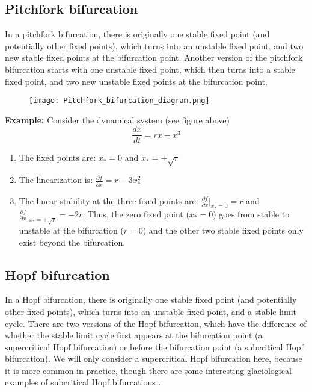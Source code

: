 \documentclass[12pt]{article}
\theoremstyle{definition}
\newcommand{\pd}[2]{\frac{\partial {#1}}{\partial {#2}}}
\begin{document}
\subsection{Pitchfork bifurcation}
In a pitchfork bifurcation, there is originally one stable fixed point (and potentially other fixed points), which turns into an unstable fixed point, and two new stable fixed points at the bifurcation point. Another version of the pitchfork bifurcation starts with one unstable fixed point, which then turns into a stable fixed point, and two new unstable fixed points at the bifurcation point.

\begin{figure}[h]
  \begin{center}
\texttt{[image: Pitchfork\_bifurcation\_diagram.png]}
  \end{center}
\end{figure}

\begin{shaded}
\textbf{Example:} Consider the dynamical system (see figure above)
\begin{equation}
\frac{dx}{dt} = rx - x^3
\end{equation}
\begin{enumerate}
\item The fixed points are: $x_* = 0$ and $x_* = \pm \sqrt{r}$
\item The linearization is: $\pd{f}{x} = r - 3x_*^2$
\item The linear stability at the three fixed points are: $\pd{f}{x}|_{x_* = 0} = r$ and $\pd{f}{x}|_{x_* = \pm \sqrt{r}} = -2r$. Thus, the zero fixed point ($x_* = 0$) goes from stable to unstable at the bifurcation ($r=0$) and the other two stable fixed points only exist beyond the bifurcation.
\end{enumerate}
\end{shaded}

\subsection{Hopf bifurcation}
In a Hopf bifurcation, there is originally one stable fixed point (and potentially other fixed points), which turns into an unstable fixed point, and a stable limit cycle. There are two versions of the Hopf bifurcation, which have the difference of whether the stable limit cycle first appears at the bifurcation point (a supercritical Hopf bifurcation) or before the bifurcation point (a subcritical Hopf bifurcation). We will only consider a supercritical Hopf bifurcation here, because it is more common in practice, though there are some interesting glaciological examples of subcritical Hopf bifurcations \cite[i.e.][]{robel-2013:ISvariability}.
\end{document}
